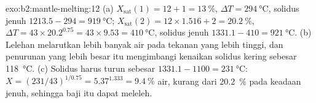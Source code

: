 \begin{solution}{exo:b2:mantle-melting:12}
(a) $X_{\mathrm{sat}}(1) = 12 + 1 = \qty{13}{\percent}$, $\Delta T =
\qty{294}{\celsius}$, solidus jenuh $1213.5 - 294 = \qty{919}{\celsius}$;
$X_{\mathrm{sat}}(2) = 12\times1.516 + 2 = \qty{20.2}{\percent}$, $\Delta T =
43\times20.2^{0.75} = 43\times9.53 = \qty{410}{\celsius}$, solidus jenuh $1331.1
- 410 = \qty{921}{\celsius}$. (b) Lelehan melarutkan lebih banyak air pada tekanan yang lebih tinggi,
dan penurunan yang lebih besar itu mengimbangi kenaikan solidus kering sebesar \qty{118}{\celsius}.
(c) Solidus harus turun sebesar $1331.1 - 1100 = \qty{231}{\celsius}$: $X =
(231/43)^{1/0.75} = 5.37^{1.333} = \qty{9.4}{\percent}$ air, kurang dari
\qty{20.2}{\percent} pada keadaan jenuh, sehingga baji itu dapat meleleh.
\end{solution}


